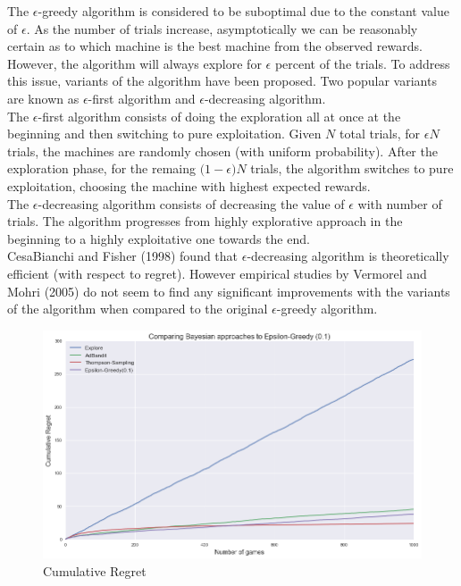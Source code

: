 \documentclass{article}
\begin{document}
The $\epsilon$-greedy algorithm is considered to be suboptimal due to the constant value of $\epsilon$. As the number of trials increase, asymptotically we can be reasonably certain as to which machine is the best machine from the observed rewards. However, the algorithm will always explore for $\epsilon$ percent of the trials. To address this issue, variants of the algorithm have been proposed. Two popular variants are known as $\epsilon$-first algorithm and $\epsilon$-decreasing algorithm.\\

The $\epsilon$-first algorithm consists of doing the exploration all at once at the beginning and then switching to pure exploitation. Given $N$ total trials, for $\epsilon N$ trials, the machines are randomly chosen (with uniform probability). After the exploration phase, for the remaing $\big( 1-\epsilon \big) N$ trials, the algorithm switches to pure exploitation, choosing the machine with highest expected rewards.\\

The $\epsilon$-decreasing algorithm consists of decreasing the value of $\epsilon$ with number of trials. The algorithm progresses from highly explorative approach in the beginning to a highly exploitative one towards the end.\\

CesaBianchi and Fisher (1998) found that $\epsilon$-decreasing algorithm is theoretically efficient (with respect to regret). However empirical studies by Vermorel and Mohri (2005) do not seem to find any significant improvements with the variants of the algorithm when compared to the original $\epsilon$-greedy algorithm.\\

\begin{figure}[H]
\centering
\includegraphics[scale=0.4]{eps_greedy.png}
\caption{Cumulative Regret}
\end{figure}
\end{document}
